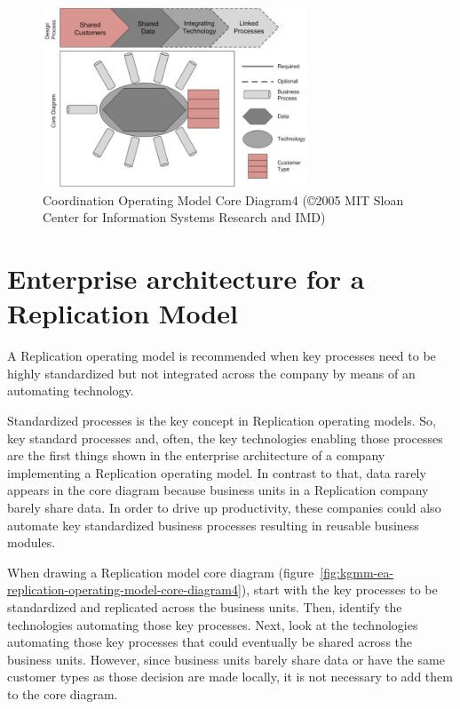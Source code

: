 \begin{figure}[ht]
    \centering
    \includegraphics[width=0.7\textwidth]{../images/coordination-operating-model-core-diagram4.jpg}
    \caption{Coordination Operating Model Core Diagram4 (©2005 MIT Sloan Center for Information Systems Research and IMD)}
    \label{fig:ekgmm-ea-coordination-operating-model-core-diagram4}
\end{figure}

\section*{Enterprise architecture for a Replication Model}

A Replication operating model is recommended when key processes need to be highly standardized but not integrated
across the company by means of an automating technology.

Standardized processes is the key concept in Replication operating models.
So, key standard processes and, often, the key technologies enabling those processes are the first things shown
in the enterprise architecture of a company implementing a Replication operating model.
In contrast to that, data rarely appears in the core diagram because business units in a Replication company
barely share data.
In order to drive up productivity, these companies could also automate key standardized business processes resulting
in reusable business modules.

When drawing a Replication model core diagram (figure~\ref{fig:kgmm-ea-replication-operating-model-core-diagram4}),
start with the key processes to be standardized and replicated across the business units.
Then, identify the technologies automating those key processes.
Next, look at the technologies automating those key processes that could eventually be shared across the business units.
However, since business units barely share data or have the same customer types as those decision are made locally,
it is not necessary to add them to the core diagram.

